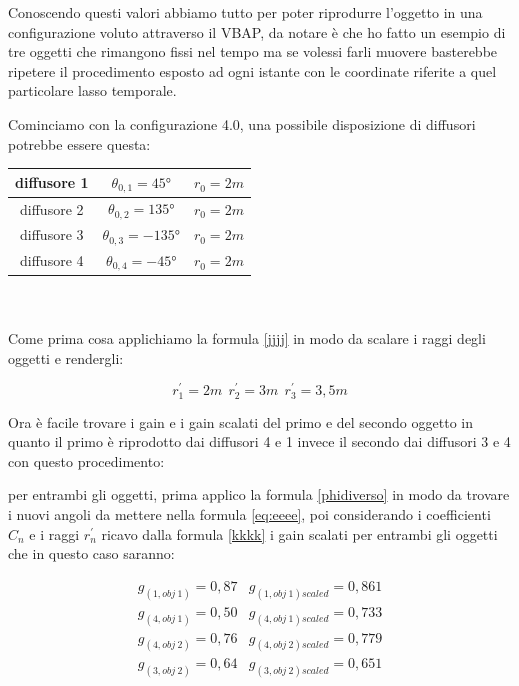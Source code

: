 \documentclass[12pt,a4paper]{report}
\begin{document}
Conoscendo questi valori abbiamo tutto per poter riprodurre l'oggetto in una configurazione voluto attraverso il VBAP, da notare è che ho fatto un esempio di tre oggetti che rimangono fissi nel tempo ma se volessi farli muovere basterebbe ripetere il procedimento esposto ad ogni istante con le coordinate riferite a quel particolare lasso temporale.

Cominciamo con la configurazione 4.0, una possibile disposizione di diffusori potrebbe essere questa:\\

\begin{tabular}{|c|c|c|}
\hline
diffusore 1 & $\theta_{0,1}=45°$ & $r_0=2m$\\
\hline
diffusore 2 & $\theta_{0,2}=135°$ & $r_0=2m$\\
\hline
diffusore 3 & $\theta_{0,3}=-135°$ & $r_0=2m$\\
\hline
diffusore 4 & $\theta_{0,4}=-45°$ & $r_0=2m$\\
\hline
\end{tabular} \\
\\

Come prima cosa applichiamo la formula \ref{jjjj} in modo da scalare i raggi degli oggetti e rendergli:

\[r_1^{\prime}=2m \ \  r_2^{\prime}=3m \ \ r_3^{\prime}=3,5m  \]

Ora è facile trovare i gain e i gain scalati del primo e del secondo oggetto in quanto il primo è riprodotto dai diffusori 4 e 1 invece il secondo dai diffusori 3 e 4 con questo procedimento:

per entrambi gli oggetti, prima applico la formula \ref{phidiverso} in modo da trovare i nuovi angoli da mettere nella formula \ref{eq:eeee}, poi considerando i coefficienti $C_n$ e i raggi $r_n^{\prime}$ ricavo dalla formula \ref{kkkk} i gain scalati per entrambi gli oggetti che in questo caso saranno:

\begin{equation}
\begin{matrix}
g_{(1,obj\ 1)} = 0,87 & g_{(1,obj\ 1)scaled} = 0,861\\
g_{(4,obj\ 1)} = 0,50 & g_{(4,obj\ 1)scaled} = 0,733\\
g_{(4,obj\ 2)} = 0,76 & g_{(4,obj\ 2)scaled} = 0,779\\
g_{(3,obj\ 2)} = 0,64 & g_{(3,obj\ 2)scaled} = 0,651\\
\end{matrix}
\label{gscalatiesempio1}
\end{equation}
\\
\end{document}
